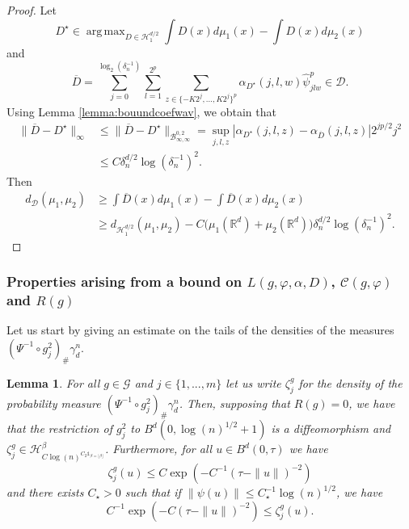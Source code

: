 \documentclass[10pt]{article}
\newtheorem{lemma}{Lemma}
\DeclareMathOperator*{\argmax}{arg\,max}
\begin{document}
\begin{proof}
   Let $$D^\star \in \argmax_{D\in \mathcal{H}_1^{d/2}}\int D(x)d\mu_1(x)-\int D(x)d\mu_2(x)$$
and 
$$\overline{D}=\sum \limits_{j=0}^{\log_2(\delta_n^{-1})} \sum \limits_{l=1}^{2^p} \sum \limits_{z\in \{-K2^j,...,K2^j\}^p} \alpha_{D^\star}(j,l,w) \hat{\psi}^p_{jlw}\in \mathcal{D}.$$
Using Lemma \ref{lemma:bouundcoefwav}, we obtain that 
\begin{align*}
\|\overline{D}-D^\star\|_{\infty}&\leq \|\overline{D}-D^\star\|_{\mathcal{B}^{0,2}_{\infty,\infty}}=\sup_{j,l,z} |\alpha_{D^\star}(j,l,z)-\alpha_{\overline{D}}(j,l,z)|2^{jp/2}j^2\\
& \leq C \delta_n^{d/2}\log(\delta_n^{-1})^2.
\end{align*}
Then
\begin{align*}
    d_{\mathcal{D}}(\mu_1,\mu_2)&\geq \int \overline{D}(x)d\mu_1(x)-\int \overline{D}(x)d\mu_2(x)\\
    &\geq d_{\mathcal{H}^{d/2}_1}(\mu_1,\mu_2)-C\Big(\mu_1(\mathbb{R}^d)+\mu_2(\mathbb{R}^d)\Big) \delta_n^{d/2}\log(\delta_n^{-1})^2.
\end{align*}
\end{proof}



\subsubsection{Properties arising from a bound on $L(g,\varphi,\alpha,D)$, $\mathcal{C}(g,\varphi)$ and $R(g)$}
Let us start by giving an estimate on the tails of the densities of the measures  $(\Psi^{-1}\circ g_j^2)_{\#} \gamma_d^n$.
\begin{lemma}\label{lemma:boundetaj}
For all $g\in \mathcal{G}$ and $j\in \{1,...,m\}$ let us write $\zeta_j^g$ for the density of the probability measure $(\Psi^{-1}\circ g_j^2)_{\#} \gamma_d^n$. Then, supposing that $R(g)=0$, we have that the restriction of $g_j^2$ to $B^d(0,\log(n)^{1/2}+1)$ is a diffeomorphism and $\zeta_j^g\in \mathcal{H}^\beta_{C\log(n)^{C_2\mathds{1}_{\beta=\lfloor \beta \rfloor}}}$. Furthermore,  for all $u\in B^d(0,\tau)$  we have
$$\zeta_j^g(u)\leq C\exp(-C^{-1}(\tau-\|u\|)^{-2})$$
and there exists $C_\star>0$ such that if $\|\psi(u)\|\leq C_\star^{-1}\log(n)^{1/2}$, we have
$$C^{-1}\exp(-C(\tau-\|u\|)^{-2})\leq \zeta_j^g(u).$$
\end{lemma}
\end{document}
